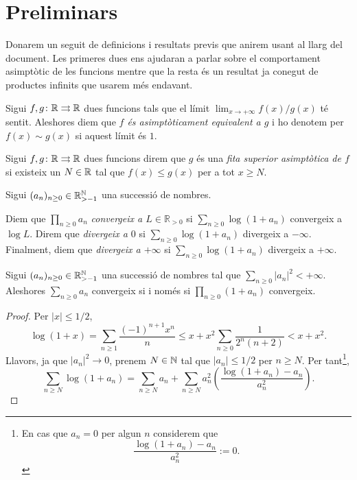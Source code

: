 \section{Preliminars}

Donarem un seguit de definicions i resultats previs que anirem usant al llarg del document. Les primeres dues ens ajudaran a parlar sobre el comportament asimptòtic de les funcions mentre que la resta és un resultat ja conegut de productes infinits que usarem més endavant.  

\begin{defi}
    Sigui $f, g\colon \mathbb{R}\rightrightarrows \mathbb{R}$ dues funcions tals que el límit $\lim_{x\to +\infty}f(x)/g(x)$ té sentit. Aleshores diem que \emph{$f$ és asimptòticament equivalent a $g$} i ho denotem per $f(x)\sim g(x)$ si aquest límit és $1$. 
\end{defi}

\begin{defi}
    Sigui $f, g\colon \mathbb{R}\rightrightarrows \mathbb{R}$ dues funcions direm que $g$ és una \emph{fita superior asimptòtica de $f$} si existeix un $N\in \mathbb{R}$ tal que $f(x)\leq g(x)$ per a tot $x\geq N$. 
\end{defi}

Sigui $(a_n)_{n\geq 0}\in \mathbb{R}_{>-1}^{\mathbb{N}}$ una successió de nombres.

\begin{defi}
    Diem que $\prod_{n\geq 0}a_n$ \emph{convergeix a $L\in \mathbb R_{> 0}$} si $\sum_{n\geq 0}\log(1+a_n)$ convergeix a $\log L$. Direm que \emph{divergeix a $0$} si $\sum_{n\geq 0}\log(1+a_n)$ divergeix a $-\infty$. Finalment, diem que \emph{divergeix a $+\infty$} si $\sum_{n\geq 0}\log(1+a_n)$ divergeix a $+\infty$.
\end{defi}

\begin{prop}\label{prop}
    Sigui $(a_n)_{n\geq 0}\in \mathbb{R}_{>-1}^{\mathbb{N}}$ una successió de nombres tal que $\sum_{n\geq 0}\lvert a_n\rvert^2<+\infty$. Aleshores $\sum_{n\geq 0}a_n$ convergeix si i només si $\prod_{n\geq 0}(1+a_n)$ convergeix.
\end{prop}
\begin{proof}
    Per $\lvert x\rvert \leq 1/2$,
    \[
    \log(1+x)=\sum_{n\geq 1}\frac{(-1)^{n+1}x^n}{n}\leq x+x^2\sum_{n\geq 0}\frac{1}{2^n(n+2)}<x+x^2.
    \]
    Llavors, ja que $\lvert a_n\rvert^2\to 0$, prenem $N\in \mathbb{N}$ tal que $\lvert a_n\rvert \leq 1/2$ per $n\geq N$. Per tant\footnote{En cas que $a_n=0$ per algun $n$ considerem que 
    \[
    \frac{\log(1+a_n)-a_n}{a_n^2}:=0.
    \]}, 
    \[
    \sum_{n\geq N}\log(1+a_n)=\sum_{n\geq N}a_n+\sum_{n\geq N}a_n^2\left(\frac{\log(1+a_n)-a_n}{a_n^2}\right).
    \]
\end{proof}



